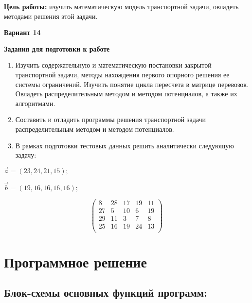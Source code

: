 \documentclass{report}
\begin{document}
	\textbf{Цель работы:} изучить математическую модель транспортной
	задачи, овладеть методами решения этой задачи.
	\begin{center}
		\textbf{Вариант 14}
	\end{center}
	\begin{center}
		\textbf{Задания для подготовки к работе}
	\end{center}
	
	\begin{enumerate}
		\item{Изучить содержательную и математическую постановки закрытой
			транспортной задачи, методы нахождения первого опорного
			решения ее системы ограничений. Изучить понятие цикла
			пересчета в матрице перевозок. Овладеть распределительным
			методом и методом потенциалов, а также их алгоритмами.} 
		\item{Составить и отладить программы решения транспортной задачи
			распределительным методом и методом потенциалов.} 
		\item{В рамках подготовки тестовых
			данных решить аналитически следующую задачу:}
	\end{enumerate}
	
	\begin{center}\Large
		$\vec{a} = (23, 24, 21, 15);$
	\end{center}
	
	\begin{center}\Large
		$\vec{b} = (19, 16, 16, 16, 16);$
	\end{center}
	
	\begin{center}
		{
			\Large\[
			\begin{pmatrix}
				8 & 28 & 17 & 19 & 11 \\
				27 & 5 & 10 & 6 & 19 \\
				29 & 11 & 3 & 7 & 8  \\
				25 & 16 & 19 & 24 & 13  \\
			\end{pmatrix}
			\]
		}
	\end{center}
	

	
	\newpage
	
	\chapter{Программное решение}
	
	\section{Блок-схемы основных функций программ:}
	
\end{document}
